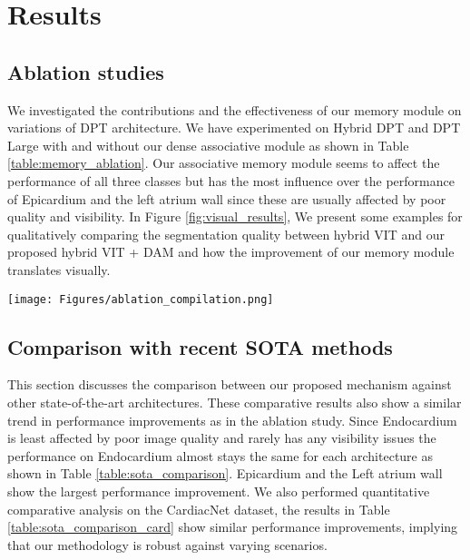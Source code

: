 \documentclass[preprint,12pt]{elsarticle}
\begin{document}
\section{Results} \label{results}
\subsection{Ablation studies}
We investigated the contributions and the effectiveness of our memory module on variations of DPT architecture. We have experimented on Hybrid DPT and DPT Large with and without our dense associative module as shown in Table \ref{table:memory_ablation}. Our associative memory module seems to affect the performance of all three classes but has the most influence over the performance of Epicardium and the left atrium wall since these are usually affected by poor quality and visibility.
In Figure \ref{fig:visual_results}, We present some examples for qualitatively comparing the segmentation quality between hybrid VIT and our proposed hybrid VIT + DAM and how the improvement of our memory module translates visually.

\begin{figure*}%
\centering
\texttt{[image: Figures/ablation\_compilation.png]}
\caption{Qualitative comparison between the Ground Truth and segmentation results for hybrid VIT and hybrid VIT + DAM, where blue, green, and red represent the Endocardium, Epicardium, and left atrium wall.}
\label{fig:visual_results}
\end{figure*}




\subsection{Comparison with recent SOTA methods}
This section discusses the comparison between our proposed mechanism against other state-of-the-art architectures. These comparative results also show a similar trend in performance improvements as in the ablation study. Since Endocardium is least affected by poor image quality and rarely has any visibility issues the performance on Endocardium almost stays the same for each architecture as shown in Table \ref{table:sota_comparison}. Epicardium and the Left atrium wall show the largest performance improvement. We also performed quantitative comparative analysis on the CardiacNet dataset, the results in Table \ref{table:sota_comparison_card} show similar performance improvements, implying that our methodology is robust against varying scenarios.
\end{document}
